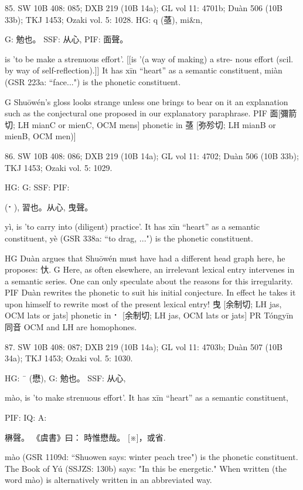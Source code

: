 85. SW 10B 408: 085; DXB 219 (10B 14a); GL vol 11: 4701b; Duàn 506 (10B 33b); TKJ 1453; Ozaki vol. 5: 1028.
HG: q (䓧), mi&n,

G:	勉也。
SSF: 从心,
PIF: 面聲。

is 'to be make a strenuous effort'. [[is '(a way of making) a stre- nous effort (scil. by way of self-reflection).]]
It has xīn ``heart'' as a semantic constituent,
miàn (GSR 223a: ``face...") is the phonetic constituent.

G	Shuōwén's gloss looks strange unless one brings to bear on it an explanation such as the conjectural one proposed in our explanatory paraphrase.
PIF     面[彌箭切; LH mianC or mienC, OCM mens] phonetic in 䓧 [弥殄切; LH mianB or mienB, OCM men)]


86. SW 10B 408: 086; DXB 219 (10B 14a); GL vol 11: 4702; Duàn 506 (10B 33b); TKJ 1453; Ozaki vol. 5: 1029.


HG:
G: SSF: PIF:

(⠂),
習也。从心, 曳聲。

yì,
is 'to carry into (diligent) practice'.
It has xīn ``heart'' as a semantic constituent,
yè (GSR 338a: ``to drag, ...") is the phonetic constituent.

HG Duàn argues that Shuōwén must have had a different head graph here, he proposes: 忕.
G	Here, as often elsewhere, an irrelevant lexical entry intervenes in a semantic series. One can only speculate about the reasons for this irregularity.
PIF Duàn rewrites the phonetic to suit his initial conjecture. In effect he takes it upon himself to rewrite most of the present lexical entry!
曳 [余制切; LH jas, OCM lats or jats] phonetic in ⠂ [余制切; LH jas, OCM lats or jats]
PR	Tóngyīn 同音 OCM and LH are homophones.



87. SW 10B 408: 087; DXB 219 (10B 14a); GL vol 11: 4703b; Duàn 507 (10B 34a); TKJ 1453; Ozaki vol. 5: 1030.

HG:  ¯ (懋),
G:	勉也。
SSF: 从心,


mào,
is 'to make strenuous effort'.
It has xīn ``heart'' as a semantic constituent,

PIF: IQ:
A:

楙聲。
《虞書》曰： 時惟懋哉。
 [※]，或省.

mào (GSR 1109d: ``Shuowen says: winter peach tree") is the phonetic constituent.
The Book of Yú (SSJZS: 130b) says:
"In this be energetic."
When written   (the word mào) is alternatively written in an abbreviated way.

